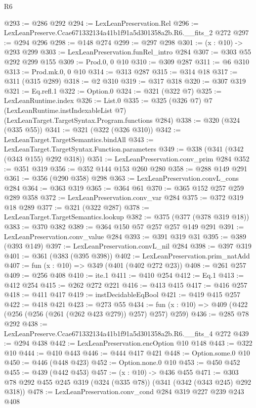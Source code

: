 \begin{lexlean}{R6}
\begin{coremodule}
@293 := @286 @292
@294 := LexLeanPreservation.Rel
@296 := LexLeanPreserve.Ccae671332134a41b1f91a5d301358a2b.R6.__fits_2 @272
@297 := @294 @296
@298 := @148 @274
@299 := @297 @298
@301 := (x : @10) -> @293 @299
@303 := LexLeanPreservation.funRel_intro @284
@307 := @303 @55 @292 @299 @155
@309 := Prod.{0, 0} @10
@310 := @309 @287
@311 := @6 @310
@313 := Prod.mk.{0, 0} @10
@314 := @313 @287
@315 := @314 @18
@317 := @311 (@315 @289)
@318 := @2 @310
@319 := @317 @318
@320 := @307 @319
@321 := Eq.refl.{1}
@322 := Option.{0}
@324 := @321 (@322 @7)
@325 := LexLeanRuntime.index
@326 := List.{0}
@335 := @325
    (@326 @7)
    @7
    (LexLeanRuntime.instIndexableList @7)
    (LexLeanTarget.TargetSyntax.Program.functions @284)
@338 := @320 (@324 (@335 @55))
@341 := @321 (@322 (@326 @310))
@342 := LexLeanTarget.TargetSemantics.bindAll
@343 := LexLeanTarget.TargetSyntax.Function.parameters
@349 := @338 (@341 (@342 (@343 @155) @292 @318))
@351 := LexLeanPreservation.conv_prim @284
@352 := @351 @319
@356 := @352 @144 @153 @260 @280
@358 := @288 @149 @291
@361 := @356 (@290 @358) @298
@363 := LexLeanPreservation.convL_cons @284
@364 := @363 @319
@365 := @364 @61
@370 := @365 @152 @257 @259 @289 @358
@372 := LexLeanPreservation.conv_var @284
@375 := @372 @319 @18 @289
@377 := @321 (@322 @287)
@378 := LexLeanTarget.TargetSemantics.lookup
@382 := @375 (@377 (@378 @319 @18))
@383 := @370 @382
@389 := @364 @150 @57 @257 @257 @149 @291
@391 := LexLeanPreservation.conv_value @284
@393 := @391 @319 @31
@395 := @389 (@393 @149)
@397 := LexLeanPreservation.convL_nil @284
@398 := @397 @319
@401 := @361 (@383 (@395 @398))
@402 := LexLeanPreservation.prim_natAdd
@407 := fun (x : @10) => @349 (@401 (@402 @272 @23))
@408 := @261 @257
@409 := @256 @408
@410 := ite.{1}
@411 := @410 @254
@412 := Eq.{1}
@413 := @412 @254
@415 := @262 @272 @221
@416 := @413 @415
@417 := @416 @257
@418 := @411 @417
@419 := instDecidableEqBool
@421 := @419 @415 @257
@422 := @418 @421
@423 := @273 @55
@434 := fun (x : @10) => @409 (@422 (@256 (@256 (@261 (@262 @423 @279)) @257) @257) @259)
@436 := @285 @78 @292
@438 := LexLeanPreserve.Ccae671332134a41b1f91a5d301358a2b.R6.__fits_4 @272
@439 := @294 @438
@442 := LexLeanPreservation.encOption @10 @148
@443 := @322 @10
@444 := @410 @443
@446 := @444 @417 @421
@448 := Option.some.{0} @10
@450 := @446 (@448 @423)
@452 := Option.none.{0} @10
@453 := @450 @452
@455 := @439 (@442 @453)
@457 := (x : @10) -> @436 @455
@471 := @303 @78 @292 @455 @245 @319 (@324 (@335 @78)) (@341 (@342 (@343 @245) @292 @318))
@478 := LexLeanPreservation.conv_cond @284 @319 @227 @239 @243 @408

\end{coremodule}
\end{lexlean}
